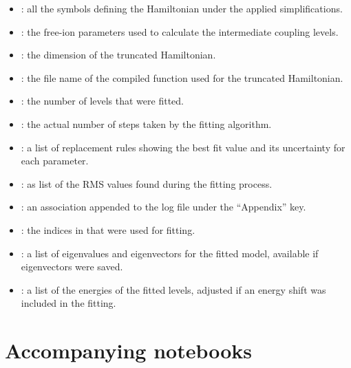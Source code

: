 \documentclass[11pt, twoside,openright]{article}
\begin{document}
\begin{itemize}
    \item {}: all the symbols defining the Hamiltonian under the applied simplifications.

    \item {}: the free-ion parameters used to calculate the intermediate coupling levels.

    \item {}: the dimension of the truncated Hamiltonian.

    \item {}: the file name of the compiled function used for the truncated Hamiltonian.
 
    \item {}: the number of levels that were fitted.

    \item {}: the actual number of steps taken by the fitting algorithm.

    \item {}: a list of replacement rules showing the best fit value and its uncertainty for each parameter.

    \item {}: as list of the RMS values found during the fitting process.

    \item {}: an association appended to the log file under the ``Appendix'' key.

    \item {}: the indices in  that were used for fitting.

    \item {}: a list of eigenvalues and eigenvectors for the fitted model, available if eigenvectors were saved.

    \item {}: a list of the energies of the fitted levels, adjusted if an energy shift was included in the fitting.
\end{itemize}

%    

\section{Accompanying notebooks}\label{section:notebooks}
\end{document}
